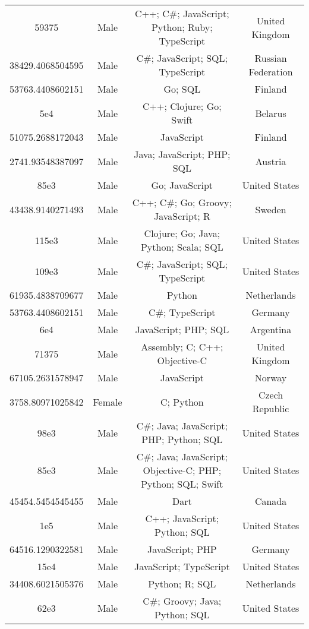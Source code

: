\begin{center}
\begin{tabular}{ |c|c|c|c| }
59375  &  Male  &  C++; C\#; JavaScript; Python; Ruby; TypeScript  &  United Kingdom  \\ 
38429.4068504595  &  Male  &  C\#; JavaScript; SQL; TypeScript  &  Russian Federation  \\ 
53763.4408602151  &  Male  &  Go; SQL  &  Finland  \\ 
5e4  &  Male  &  C++; Clojure; Go; Swift  &  Belarus  \\ 
51075.2688172043  &  Male  &  JavaScript  &  Finland  \\ 
2741.93548387097  &  Male  &  Java; JavaScript; PHP; SQL  &  Austria  \\ 
85e3  &  Male  &  Go; JavaScript  &  United States  \\ 
43438.9140271493  &  Male  &  C++; C\#; Go; Groovy; JavaScript; R  &  Sweden  \\ 
115e3  &  Male  &  Clojure; Go; Java; Python; Scala; SQL  &  United States  \\ 
109e3  &  Male  &  C\#; JavaScript; SQL; TypeScript  &  United States  \\ 
61935.4838709677  &  Male  &  Python  &  Netherlands  \\ 
53763.4408602151  &  Male  &  C\#; TypeScript  &  Germany  \\ 
6e4  &  Male  &  JavaScript; PHP; SQL  &  Argentina  \\ 
71375  &  Male  &  Assembly; C; C++; Objective-C  &  United Kingdom  \\ 
67105.2631578947  &  Male  &  JavaScript  &  Norway  \\ 
3758.80971025842  &  Female  &  C; Python  &  Czech Republic  \\ 
98e3  &  Male  &  C\#; Java; JavaScript; PHP; Python; SQL  &  United States  \\ 
85e3  &  Male  &  C\#; Java; JavaScript; Objective-C; PHP; Python; SQL; Swift  &  United States  \\ 
45454.5454545455  &  Male  &  Dart  &  Canada  \\ 
1e5  &  Male  &  C++; JavaScript; Python; SQL  &  United States  \\ 
64516.1290322581  &  Male  &  JavaScript; PHP  &  Germany  \\ 
15e4  &  Male  &  JavaScript; TypeScript  &  United States  \\ 
34408.6021505376  &  Male  &  Python; R; SQL  &  Netherlands  \\ 
62e3  &  Male  &  C\#; Groovy; Java; Python; SQL  &  United States  \\ 

\end{tabular}
\end{center}
